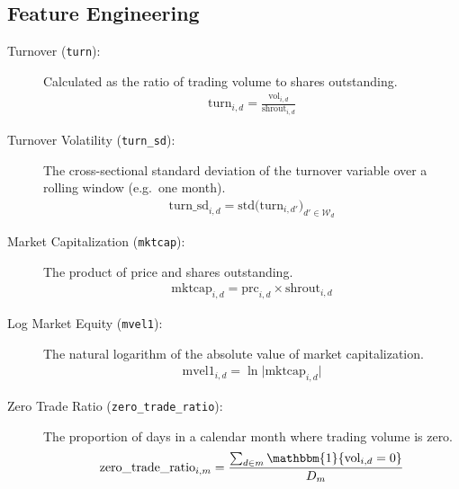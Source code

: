 \subsection{Feature Engineering} \label{sec:feature_engineering}
\begin{description}
    \item[Turnover (\texttt{turn}):]  
      Calculated as the ratio of trading volume to shares outstanding.
      \begin{equation}
      \label{eq:turn}
      \begin{split}
      \text{turn}_{i,d} = \frac{\text{vol}_{i,d}}{\text{shrout}_{i,d}}
      \end{split}
      \end{equation}
  
    \item[Turnover Volatility (\texttt{turn\_sd}):]  
      The cross-sectional standard deviation of the turnover variable over a rolling window (e.g.\ one month).
      \begin{equation}
      \label{eq:turn_sd}
      \begin{split}
      \text{turn\_sd}_{i,d} = \mathrm{std}\bigl(\text{turn}_{i,d'}\bigr)_{d' \in \mathcal{W}_d}
      \end{split}
      \end{equation}
  
    \item[Market Capitalization (\texttt{mktcap}):]  
      The product of price and shares outstanding.
      \begin{equation}
      \label{eq:mktcap}
      \begin{split}
      \text{mktcap}_{i,d} = \text{prc}_{i,d}\times \text{shrout}_{i,d}
      \end{split}
      \end{equation}
  
    \item[Log Market Equity (\texttt{mvel1}):]  
      The natural logarithm of the absolute value of market capitalization.
      \begin{equation}
      \label{eq:mvel1}
      \begin{split}
      \text{mvel1}_{i,d} = \ln\bigl|\text{mktcap}_{i,d}\bigr|
      \end{split}
      \end{equation}
  
    \item[Zero Trade Ratio (\texttt{zero\_trade\_ratio}):]  
      The proportion of days in a calendar month where trading volume is zero.
      \begin{equation}
      \label{eq:zero_trade_ratio}
      \text{zero\_trade\_ratio}_{i,m}
      = \frac{\sum_{d\in m}\mathbbm{1}\{\text{vol}_{i,d}=0\}}{D_m}
      \end{equation}
  

\end{description}
